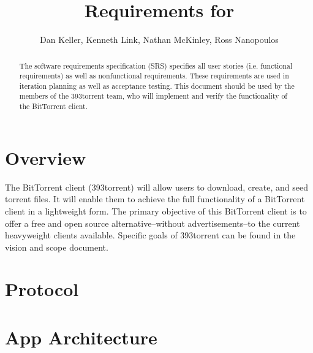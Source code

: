 \documentclass[letter]{scrartcl}
\newcommand{\app}{\sc{393torrent}}
\begin{document}
\title{Requirements for \app}
\subtitle{Dan Keller, Kenneth Link, Nathan McKinley, Ross Nanopoulos}
\date{} %

\maketitle

\begin{abstract}

The software requirements specification (SRS) specifies all user stories (i.e. functional requirements) as well as nonfunctional requirements. These requirements are used in iteration planning as well as acceptance testing.  This document should be used by the members of the 393torrent team, who will implement and verify the functionality of the BitTorrent client.
\end{abstract}

\tableofcontents
\pagebreak

\section{Overview}
The BitTorrent client (393torrent) will allow users to download, create, and seed torrent files.  It will enable them to achieve the full functionality of a BitTorrent client in a lightweight form.  The primary objective of this BitTorrent client is to offer a free and open source alternative--without advertisements--to the current heavyweight clients available.  Specific goals of 393torrent can be found in the vision and scope document.

\section{Protocol}

\section{App Architecture}
\end{document}
